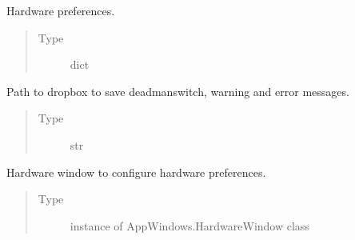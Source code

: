 \documentclass[letterpaper,10pt,english]{sphinxmanual}
\begin{document}
\begin{fulllineitems}
\begin{fulllineitems}
\end{fulllineitems}


\begin{fulllineitems}
\label{\detokenize{NoSeMazeController/main:main.MainApp.hardware_prefs}}
\pysigstartsignatures
{}
\pysigstopsignatures
\sphinxAtStartPar
Hardware preferences.
\begin{quote}\begin{description}
\item[{Type}] \leavevmode
\sphinxAtStartPar
dict

\end{description}\end{quote}

\end{fulllineitems}


\begin{fulllineitems}
\label{\detokenize{NoSeMazeController/main:main.MainApp.dropbox_path}}
\pysigstartsignatures
{}
\pysigstopsignatures
\sphinxAtStartPar
Path to dropbox to save deadman\sphinxhyphen{}switch, warning and error messages.
\begin{quote}\begin{description}
\item[{Type}] \leavevmode
\sphinxAtStartPar
str

\end{description}\end{quote}

\end{fulllineitems}


\begin{fulllineitems}
\label{\detokenize{NoSeMazeController/main:main.MainApp.hardware_window}}
\pysigstartsignatures
{}
\pysigstopsignatures
\sphinxAtStartPar
Hardware window to configure hardware preferences.
\begin{quote}\begin{description}
\item[{Type}] \leavevmode
\sphinxAtStartPar
instance of AppWindows.HardwareWindow class


\end{description}
\end{quote}
\end{fulllineitems}
\end{fulllineitems}
\end{document}
